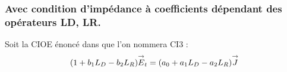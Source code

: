 








\subsubsection{Avec condition d'impédance à coefficients dépendant des opérateurs LD, LR.}

Soit la CIOE énoncé dans \cite{soudais_3d_2017} que l'on nommera CI3 :
\begin{equation}
\label{eq:unicite:ci3:ci3}
( 1 + b_1 L_D - b_2 L_R){\overset{\rightarrow}{E}}_t = (a_0 + a_1 L_D - a_2 L_R ) {\overset{\rightarrow}{J}}
\end{equation}

